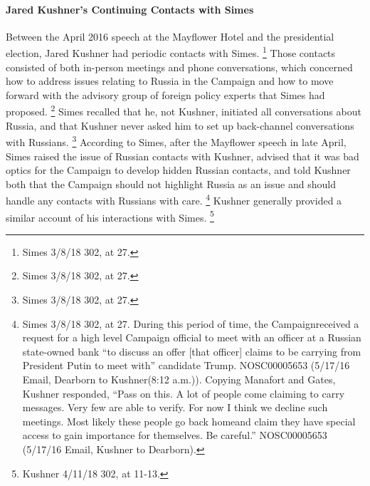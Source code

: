 \paragraph{Jared Kushner's Continuing Contacts with Simes}

Between the April 2016 speech at the Mayflower Hotel and the presidential election, Jared Kushner had periodic contacts with Simes.%
\footnote{Simes 3/8/18 302, at 27.}
Those contacts consisted of both in-person meetings and phone conversations, which concerned how to address issues relating to Russia in the Campaign and how to move forward with the advisory group of foreign policy experts that Simes had proposed.%
\footnote{Simes 3/8/18 302, at 27.}
Simes recalled that he, not Kushner, initiated all conversations about Russia, and that Kushner never asked him to set up back-channel conversations with Russians.%
\footnote{Simes 3/8/18 302, at 27.}
According to Simes, after the Mayflower speech in late April, Simes raised the issue of Russian contacts with Kushner, advised that it was bad optics for the Campaign to develop hidden Russian contacts, and told Kushner both that the Campaign should not highlight Russia as an issue and should handle any contacts with Russians with care.%
\footnote{Simes 3/8/18 302, at 27. 
During this period of time, the Campaignreceived a request for a high level Campaign official to meet with an officer at a Russian state-owned bank “to discuss an offer [that officer] claims to be carrying from President Putin to meet with” candidate Trump. 
NOSC00005653 (5/17/16 Email, Dearborn to Kushner(8:12 a.m.)). 
Copying Manafort and Gates, Kushner responded, “Pass on this. 
A lot of people come claiming to carry messages. 
Very few are able to verify. 
For now I think we decline such meetings. 
Most likely these people go back homeand claim they have special access to gain importance for themselves. 
Be careful.” 
NOSC00005653 (5/17/16 Email, Kushner to Dearborn).}
Kushner generally provided a similar account of his interactions with Simes.%
\footnote{Kushner 4/11/18 302, at 11-13.}

